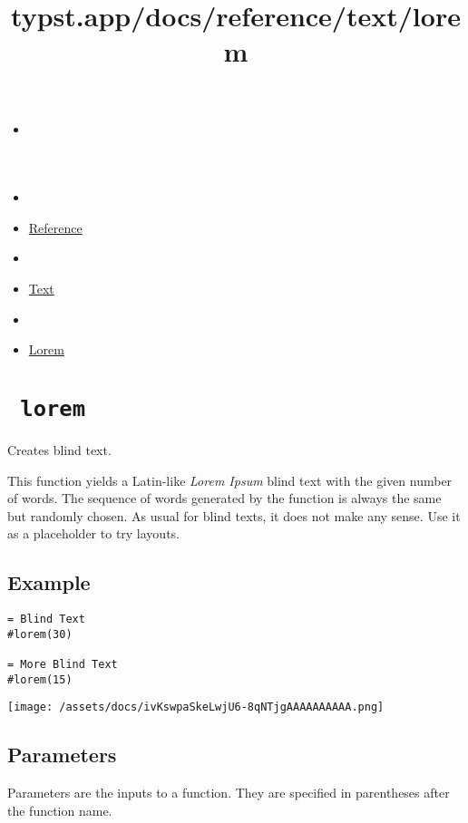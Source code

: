 \title{typst.app/docs/reference/text/lorem}

\begin{itemize}
\tightlist
\item
  \href{/docs}{}
\item
  
\item
  \href{/docs/reference/}{Reference}
\item
  
\item
  \href{/docs/reference/text/}{Text}
\item
  
\item
  \href{/docs/reference/text/lorem/}{Lorem}
\end{itemize}

\section{\texorpdfstring{\texttt{\ lorem\ }}{ lorem }}\label{summary}

Creates blind text.

This function yields a Latin-like \emph{Lorem Ipsum} blind text with the
given number of words. The sequence of words generated by the function
is always the same but randomly chosen. As usual for blind texts, it
does not make any sense. Use it as a placeholder to try layouts.

\subsection{Example}\label{example}

\begin{verbatim}
= Blind Text
#lorem(30)

= More Blind Text
#lorem(15)
\end{verbatim}

\texttt{[image: /assets/docs/ivKswpaSkeLwjU6-8qNTjgAAAAAAAAAA.png]}

\subsection{\texorpdfstring{{ Parameters
}}{ Parameters }}\label{parameters}

\label{parameters-tooltip}
Parameters are the inputs to a function. They are specified in
parentheses after the function name.

